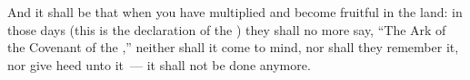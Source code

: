 
\begin{inparaenum}


   And it shall be that when you have multiplied and become fruitful in the land: in those days (this is the declaration of the \lord) they shall no more say, ``The Ark of the Covenant of the \lord,'' neither shall it come to mind, nor shall they remember it, nor give heed unto it~--- it shall not be done anymore.%

\end{inparaenum}
